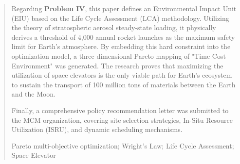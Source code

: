 \begin{abstract}
\indent Regarding \textbf{Problem IV}, this paper defines an Environmental Impact Unit (EIU) based on the Life Cycle Assessment (LCA) methodology. Utilizing the theory of stratospheric aerosol steady-state loading, it physically derives a threshold of 4,000 annual rocket launches as the maximum safety limit for Earth's atmosphere. By embedding this hard constraint into the optimization model, a three-dimensional Pareto mapping of "Time-Cost-Environment" was generated. The research proves that maximizing the utilization of space elevators is the only viable path for Earth's ecosystem to sustain the transport of 100 million tons of materials between the Earth and the Moon.

\indent Finally, a comprehensive policy recommendation letter was submitted to the MCM organization, covering site selection strategies, In-Situ Resource Utilization (ISRU), and dynamic scheduling mechanisms.
\begin{keywords}
Pareto multi-objective optimization; Wright's Law; Life Cycle Assessment; Space Elevator
\end{keywords}
\end{abstract}